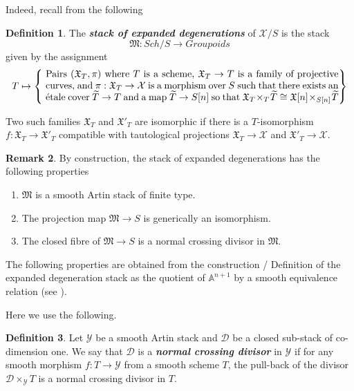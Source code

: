 \documentclass[11pt]{amsart}
\theoremstyle{plain}
\numberwithin{equation}{section}
\theoremstyle{definition}
\newtheorem{Def}{Definition}[section]
\newtheorem{Rem}[Def]{Remark}
\theoremstyle{plain}
\begin{document}
Indeed, recall from \cite[Definition 1.9, Proposition 1.10]{Li} the following
\begin{Def}\label{Exp1123} The \emph{\bfseries stack of expanded degenerations} of $\mathcal{X}/S$ is the stack
$$
\mathfrak{M}: {Sch}/S\longrightarrow {Groupoids} 
$$ 
given by the assignment
\begin{equation}
T
\mapsto \left\{
\text{
\begin{minipage}[c]{4.2in}
Pairs $(\mathfrak X_T, \pi)$ where $T$ is a scheme, $\mathfrak X_T\to T$ is a family of projective curves, and $\pi: \mathfrak X_T\to \mathcal X$ is a morphism over $S$ such that there exists an \'{e}tale cover
$\widetilde{T}\to T$ and a map $\widetilde{T}\to S[n]$ so that  $\mathfrak X_T\times_T \widetilde{T}\cong \mathfrak X[n]\times_{S[n]} \widetilde{T}$
\end{minipage}}
\right\}
\end{equation}

\smallskip

\noindent
Two such families $\mathfrak X_T$ and $\mathfrak X'_{T}$ are isomorphic if there is a $T$-isomorphism \linebreak $f: \mathfrak X_T \longrightarrow \mathfrak X'_{T}$ compatible with tautological projections $\mathfrak X_T \longrightarrow \mathcal X$ and $\mathfrak X'_T \longrightarrow \mathcal X$.
\end{Def}

\begin{Rem}
By construction, the stack of expanded degenerations has the following properties 
\begin{enumerate}
\item $\mathfrak M$ is a smooth Artin stack of finite type.
\item The projection map $\mathfrak M\longrightarrow S$ is generically an isomorphism.
\item The closed fibre of $
\mathfrak{M} \to S$ is a normal crossing divisor in $\mathfrak{M}$.  
\end{enumerate}
\end{Rem}

The following properties are obtained from the construction / Definition of the expanded degeneration stack as the quotient of $\mathbb A^{n+1}$ by a smooth equivalence relation (see \cite[page 16, Def. 2.22.]{Z}). 

\smallskip


Here we use the following. 
\begin{Def}
Let $\mathcal Y$ be a smooth Artin stack and $\mathcal D$ be a closed sub-stack of co-dimension one. We say that $\mathcal D$ is a \emph{\bfseries normal crossing divisor} in $\mathcal{Y}$ if for any smooth morphism $f: T\rightarrow \mathcal Y$ from a smooth scheme $T$, the pull-back of the divisor $\mathcal D\times_{\mathcal Y} T$ is a normal crossing divisor in $T$.
\end{Def}
\end{document}
